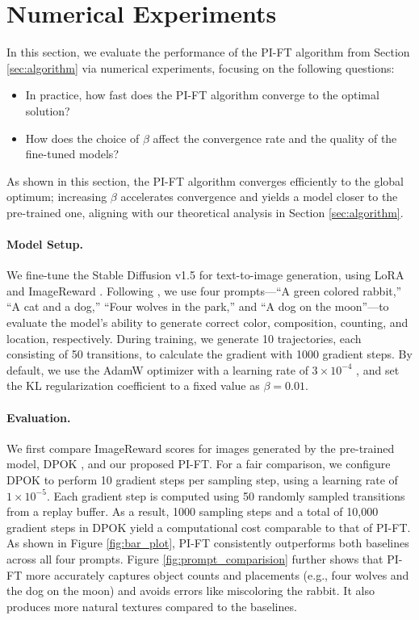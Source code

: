 \documentclass{article}
\begin{document}
{\color{black}
\section{Numerical Experiments}\label{sec:experiment}
In this section, we evaluate the performance of the PI-FT algorithm from Section \ref{sec:algorithm} via numerical experiments, focusing on the following questions:

\begin{itemize}

    \item In practice, how fast does the PI-FT algorithm converge to the optimal solution?

    \item How does the choice of $\beta$ affect the convergence rate and the quality of the fine-tuned models?
\end{itemize}

As shown in this section, the PI-FT algorithm converges efficiently to the global optimum; increasing $ \beta $ accelerates convergence and yields a model closer to the pre-trained one, aligning with our theoretical analysis in Section \ref{sec:algorithm}.

\paragraph{Model Setup.}
We fine-tune the Stable Diffusion v1.5 \citep{rombach2022high} for text-to-image generation, using LoRA \citep{hu2021lora} and ImageReward \citep{xu2023imagereward}. Following  \citep{fan2024reinforcement}, we use four prompts—``A green colored rabbit,” ``A cat and a dog,” ``Four wolves in the park,” and ``A dog on the moon”—to evaluate the model’s ability to generate correct color, composition, counting, and location, respectively. During training, we generate 10 trajectories, each consisting of 50 transitions, to calculate the gradient with 1000 gradient steps. By default, we use the AdamW optimizer with a learning rate of $ 3 \times 10^{-4} $ , and set the KL regularization coefficient to a fixed value as $ \beta = 0.01 $. 

\paragraph{Evaluation.}
We first compare ImageReward scores for images generated by the pre-trained model, DPOK \citep{fan2024reinforcement}, and our proposed PI-FT. For a fair comparison, we configure DPOK to perform 10 gradient steps per sampling step, using a learning rate of $ 1 \times 10^{-5} $. Each gradient step is computed using 50 randomly sampled transitions from a replay buffer. As a result, 1000 sampling steps and a total of 10,000 gradient steps in DPOK yield a computational cost comparable to that of PI-FT. As shown in Figure \ref{fig:bar_plot}, PI-FT consistently outperforms both baselines across all four prompts. Figure \ref{fig:prompt_comparision} further shows that PI-FT more accurately captures object counts and placements (e.g., four wolves and the dog on the moon) and avoids errors like miscoloring the rabbit. It also produces more natural textures compared to the baselines.

}
\end{document}
